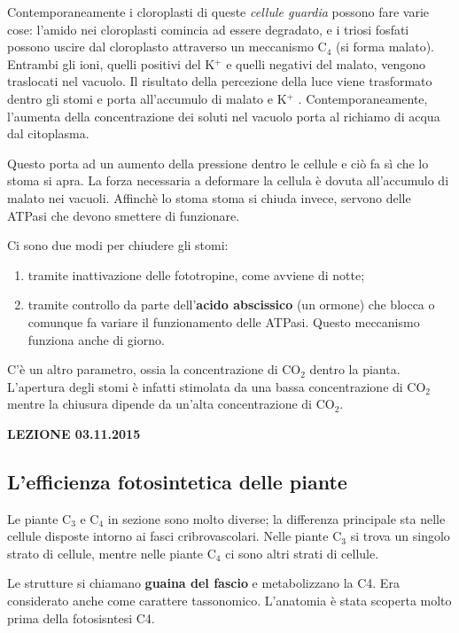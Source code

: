 \documentclass[]{article}
\begin{document}
Contemporaneamente i cloroplasti di queste \emph{cellule guardia}
possono fare varie cose: l'amido nei cloroplasti comincia ad essere
degradato, e i triosi fosfati possono uscire dal cloroplasto attraverso
un meccanismo C$_4$ (si forma malato). Entrambi gli ioni, quelli
positivi del K$^+$ e quelli negativi del malato, vengono traslocati nel
vacuolo. Il risultato della percezione della luce viene trasformato
dentro gli stomi e porta all'accumulo di malato e K$^+$ .
Contemporaneamente, l'aumenta della concentrazione dei soluti nel
vacuolo porta al richiamo di acqua dal citoplasma.

Questo porta ad un aumento della pressione dentro le cellule e ciò fa sì
che lo stoma si apra. La forza necessaria a deformare la cellula è
dovuta all'accumulo di malato nei vacuoli. Affinchè lo stoma stoma si
chiuda invece, servono delle ATPasi che devono smettere di funzionare.

Ci sono due modi per chiudere gli stomi:

\begin{enumerate}
\def\labelenumi{\arabic{enumi}.}
\itemsep1pt\parskip0pt
\item
  tramite inattivazione delle fototropine, come avviene di notte;
\item
  tramite controllo da parte dell'\textbf{acido abscissico} (un ormone)
  che blocca o comunque fa variare il funzionamento delle ATPasi. Questo
  meccanismo funziona anche di giorno.
\end{enumerate}

C'è un altro parametro, ossia la concentrazione di CO$_2$ dentro la
pianta. L'apertura degli stomi è infatti stimolata da una bassa
concentrazione di CO$_2$ mentre la chiusura dipende da un'alta
concentrazione di CO$_2$.

\textbf{LEZIONE 03.11.2015}

\subsection{L'efficienza fotosintetica delle
piante}\label{lefficienza-fotosintetica-delle-piante}

Le piante C$_3$ e C$_4$ in sezione sono molto diverse; la differenza
principale sta nelle cellule disposte intorno ai fasci cribrovascolari.
Nelle piante C$_3$ si trova un singolo strato di cellule, mentre nelle
piante C$_4$ ci sono altri strati di cellule.

Le strutture si chiamano \textbf{guaina del fascio} e metabolizzano la
C4. Era considerato anche come carattere tassonomico. L'anatomia è stata
scoperta molto prima della fotosisntesi C4.
\end{document}
